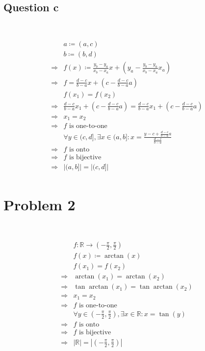 \documentclass{article}
\begin{document}
~

\subsection*{Question c}

~

\begin{equation*}
    \begin{split}
        &a\coloneqq (a,c)\\
        &b\coloneqq (b,d)\\
        \Rightarrow &f(x)\coloneqq \frac{y_b-y_a}{x_b-x_a}x+(y_a-\frac{y_b-y_a}{x_b-x_a} x_a)\\
        \Rightarrow &f=\frac{d-c}{b-a}x+(c-\frac{d-c}{b-a}a)\\
        &f(x_1)=f(x_2)\\
        \Rightarrow &\frac{d-c}{b-a}x_1+(c-\frac{d-c}{b-a}a)=\frac{d-c}{b-a}x_1+(c-\frac{d-c}{b-a}a)\\
        \Rightarrow &x_1=x_2\\
        \Rightarrow &f\text{ is one-to-one}\\
        &\forall y\in(c,d],\exists x\in(a,b]:x=\frac{y-c+\frac{d-c}{b-a}a}{\frac{d-c}{b-a}}\\
        \Rightarrow &f\text{ is onto}\\
        \Rightarrow &f \text{ is bijective}\\
        \Rightarrow &|(a,b]|=|(c,d]|\\
    \end{split}
\end{equation*}

\newpage

\section*{Problem 2}

~

\begin{equation*}
    \begin{split}
        &f :\mathbb{R} \rightarrow (-\frac{\pi}{2},\frac{\pi}{2})\\
        &f(x)\coloneqq \arctan(x)\\
        &f(x_1)=f(x_2)\\
        \Rightarrow&\arctan(x_1)=\arctan(x_2)\\
        \Rightarrow&\tan\arctan(x_1)=\tan\arctan(x_2)\\
        \Rightarrow&x_1=x_2\\
        \Rightarrow&f\text{ is one-to-one}\\
        &\forall y\in(-\frac{\pi}{2},\frac{\pi}{2}),\exists x\in\mathbb{R} :x=\tan(y)\\
        \Rightarrow& f\text{ is onto}\\
        \Rightarrow&f\text{ is bijective}\\
        \Rightarrow&|\mathbb{R} |=|(-\frac{\pi}{2},\frac{\pi}{2})|\\
    \end{split}
\end{equation*}
\end{document}
